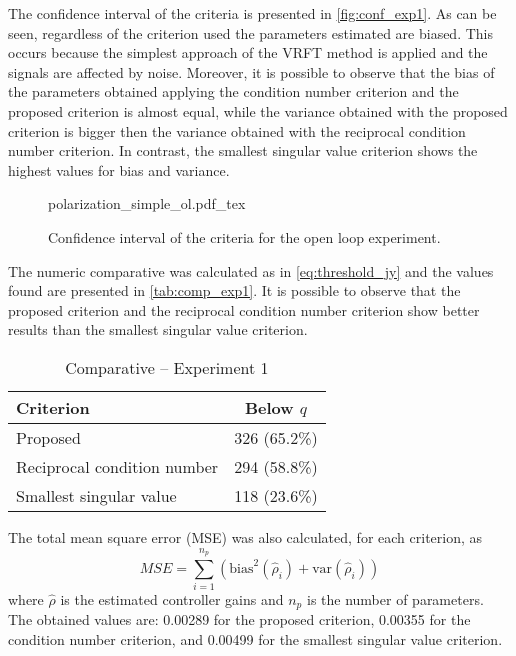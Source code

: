 The confidence interval of the criteria is presented in \autoref{fig:conf_exp1}.
As can be seen, regardless of the criterion used the parameters estimated are biased.
This occurs because the simplest approach of the VRFT method is applied and the signals are affected by noise.
Moreover, it is possible to observe that the bias of the parameters obtained applying the condition number criterion and the proposed criterion is almost equal, while the variance obtained with the proposed criterion is bigger then the variance obtained with the reciprocal condition number criterion.
In contrast, the smallest singular value criterion shows the highest values for bias and variance.
\begin{figure}[h!]
  \centering
  \def\svgwidth{\columnwidth}
  {\footnotesize{polarization_simple_ol.pdf_tex}}
  \caption{\label{fig:conf_exp1} Confidence interval of the criteria for the open loop experiment.}
\end{figure}


The numeric comparative was calculated as in \eqref{eq:threshold_jy} and the values found are presented in \autoref{tab:comp_exp1}.
It is possible to observe that the proposed criterion and the reciprocal condition number criterion show better results than the smallest singular value criterion.
\begin{table}[h!]
  \caption{Comparative -- Experiment 1 \label{tab:comp_exp1}}
  \centering
  \begin{tabular}{lc}
  \toprule
  Criterion & Below $q$\\
  \midrule
  Proposed & 326 (65.2\%) \\
  Reciprocal condition number & 294 (58.8\%) \\
  Smallest singular value & 118 (23.6\%) \\
  \bottomrule
  \end{tabular}
\end{table}


The total mean square error (MSE) was also calculated, for each criterion, as
\begin{equation}
	MSE = \sum\limits_{i=1}^{n_p}\left( \text{bias}^2(\hat{\rho}_i) + \text{var}(\hat{\rho}_i) \right)
\label{eq:mse}
\end{equation}
where $\hat{\rho}$ is the estimated controller gains and $n_p$ is the number of parameters.
The obtained values are: 0.00289 for the proposed criterion, 0.00355 for the condition number criterion, and 0.00499 for the smallest singular value criterion.


